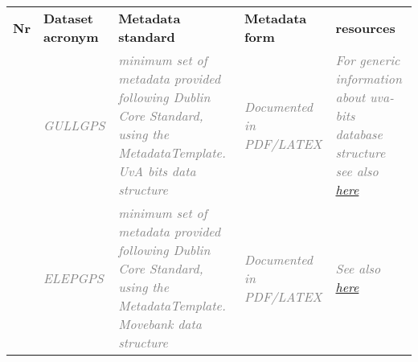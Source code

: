 \documentclass[12pt]{article}
\begin{document}
\begin{table}[H]
 			\centering
\begin{tabular}{p{0.20in}p{}p{1.80in}p{1.00in}p{1.30in}}
\hline
\multicolumn{1}{|p{0.20in}}{\textbf{Nr}} & 
\multicolumn{1}{|p{1.00in}}{\textbf{Dataset acronym}} & 
\multicolumn{1}{|p{1.80in}}{\textbf{Metadata standard}} & 
\multicolumn{1}{|p{1.00in}|}{\textbf{Metadata form}} &
\multicolumn{1}{|p{1.30in}|}{\textbf{resources}} \\
\hhline{-----}
\multicolumn{1}{|p{0.20in}}{\textit{\textcolor[HTML]{808080}{D1}}} & %
\multicolumn{1}{|p{1.00in}}{\textit{\textcolor[HTML]{808080}{GULLGPS}}} & %
\multicolumn{1}{|p{1.80in}|}{\textit{\textcolor[HTML]{808080}{minimum set of metadata provided following Dublin Core Standard, using the MetadataTemplate. \newline UvA bits data structure
}}} & %
\multicolumn{1}{|p{1.00in}|}{\textit{\textcolor[HTML]{808080}{Documented in PDF/LATEX}}} & %
\multicolumn{1}{|p{1.30in}|}{\textit{\textcolor[HTML]{808080}{For generic information about uva-bits database structure see also \href{https://wiki.pubserv.e-ecology.nl/wiki/index.php/DB\_Views\_2015}{here}}}} \\ %
\hhline{-----}
\multicolumn{1}{|p{0.20in}}{\textit{\textcolor[HTML]{808080}{D2}}} & %
\multicolumn{1}{|p{1.00in}}{\textit{\textcolor[HTML]{808080}{ELEPGPS}}} & %
\multicolumn{1}{|p{1.80in}|}{\textit{\textcolor[HTML]{808080}{minimum set of metadata provided following Dublin Core Standard, using the MetadataTemplate. \newline Movebank data structure
}}} & %
\multicolumn{1}{|p{1.00in}|}{\textit{\textcolor[HTML]{808080}{Documented in PDF/LATEX}}} & %
\multicolumn{1}{|p{1.30in}|}{\textit{\textcolor[HTML]{808080}{See also 
 \href{https://www.movebank.org/panel_embedded_movebank_webapp?gwt_fragment=page\%3Dsearch_map_linked\%2CindividualIds\%3D307790752*\%2B307790755*\%2B307790758*\%2B307790761*\%2B307790764*\%2B307790767*\%2B307790770*\%2B307790773*\%2B307790776*\%2B307790710*\%2B307790716*\%2B307790719*\%2B307790722*\%2B307790725*\%2B307790728*\%2B307790731*\%2B307790734*\%2B307790737*\%2B307790740*\%2B307790743*\%2B307790746*\%2B307790749*\%2B307790668*\%2B307790703*\%2B307790677*\%2B307790680*\%2B307790683*\%2B307790686*\%2B307790690*\%2B307790693*\%2B307790696*\%2B307790700*\%2Clat\%3D-19.210471191824794\%2Clon\%3D26.19414150000129\%2Cz\%3D8}{here}}}} \\ %

\end{tabular}
\end{table}
\end{document}
